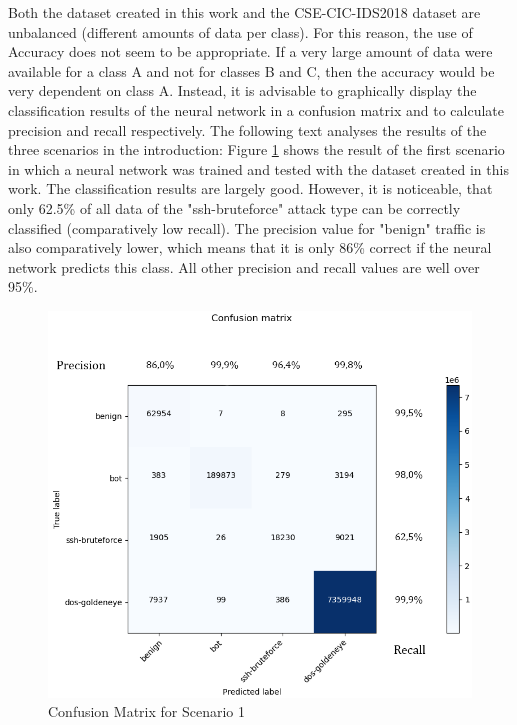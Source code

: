 \documentclass[conference]{IEEEtran}
\begin{document}
Both the dataset created in this work and the CSE-CIC-IDS2018 dataset \cite{max2} are unbalanced (different amounts of data per class). For this reason, the use of Accuracy does not seem to be appropriate. If a very large amount of data were available for a class A and not for classes B and C, then the accuracy would be very dependent on class A. Instead, it is advisable to graphically display the classification results of the neural network in a confusion matrix and to calculate precision and recall respectively. The following text analyses the results of the three scenarios in the introduction:
Figure  \ref{fig:cm1} shows the result of the first scenario in which a neural network was trained and tested with the dataset created in this work. The classification results are largely good. However, it is noticeable, that only 62.5\% of all data of the "ssh-bruteforce" attack type can be correctly classified (comparatively low recall). The precision value for "benign" traffic is also comparatively lower, which means that it is only 86\% correct if the neural network predicts this class. All other precision and recall values are well over 95\%.

\begin{figure}[htbp]  
\centerline{\includegraphics[scale=0.65]{NeuesModellNeueDaten.png}}
\caption{Confusion Matrix for Scenario 1}
\label{fig:cm1}
\end{figure}
\end{document}
